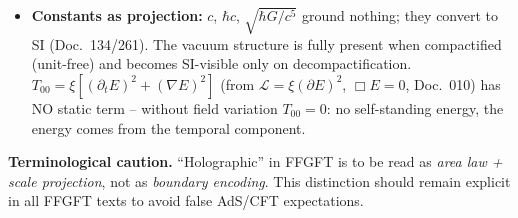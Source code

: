 \begin{itemize}
        of scale ($L_0=\xi\ell_P$ instead of $R_H$), not on the energy--length
        duality (in natural units both are dual via $\hbar c$). But the chain
        $\xi\to E_H=E_0\xi^{41/4}\to R_H=\hbar c/E_H\to H_0=E_H/\hbar$ does exist
        ($\approx 66.2$ km/s/Mpc; Doc.~026/182), with $\hbar c$ as the SI factor.
        $H_0$ is thus a geometric coefficient misread as expansion; the
        model-neutral quantity remains the observable $z(d)$.
        Open: exponent $41/4$ not yet fully derived.
  \item \textbf{Constants as projection:} $c$, $\hbar c$, $\sqrt{\hbar G/c^5}$
        ground nothing; they convert to SI (Doc.~134/261). The vacuum structure
        is fully present when compactified (unit-free) and becomes SI-visible
        only on decompactification. $T_{00}=\xi[(\partial_t E)^2+(\nabla E)^2]$
        (from $\mathcal{L}=\xi(\partial E)^2$, $\Box E=0$, Doc.~010) has NO static
        term -- without field variation $T_{00}=0$: no self-standing energy,
        the energy comes from the temporal component.
\end{itemize}

\noindent
\textbf{Terminological caution.} \enquote{Holographic} in FFGFT is to be read
as \emph{area law + scale projection}, not as \emph{boundary encoding}. This
distinction should remain explicit in all FFGFT texts to avoid false AdS/CFT
expectations.
